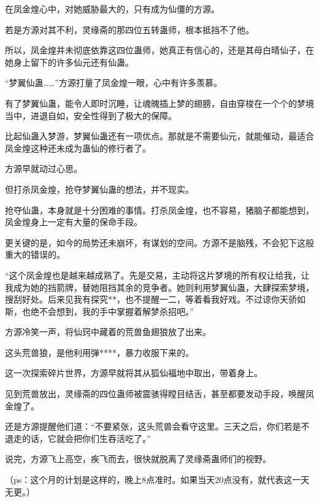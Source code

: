 \begin{this_body}
在凤金煌心中，对她威胁最大的，只有成为仙僵的方源。

若是方源对其不利，灵缘斋的那四位五转蛊师，根本抵挡不了他。

所以，凤金煌并未彻底依靠这四位蛊师，她真正有信心的，还是其母白晴仙子，在她身上留下的许多仙元还有仙蛊。

“梦翼仙蛊……”方源打量了凤金煌一眼，心中有许多羡慕。

有了梦翼仙蛊，能令人即时沉睡，让魂魄插上梦的翅膀，自由穿梭在一个个的梦境当中，进退自如，安全性得到了极大的保障。

比起仙蛊入梦游，梦翼仙蛊还有一项优点。那就是不需要仙元，就能催动，最适合凤金煌这种还未成为蛊仙的修行者了。

方源早就动过心思。

但打杀凤金煌，抢夺梦翼仙蛊的想法，并不现实。

抢夺仙蛊，本身就是十分困难的事情。打杀凤金煌，也不容易，猪脑子都能想到，凤金煌身上一定有大量的保命手段。

更关键的是，如今的局势还未崩坏，有谋划的空间。方源不是脑残，不会犯下这般重大的错误的。

“这个凤金煌也是越来越成熟了。先是交易，主动将这片梦境的所有权让给我，让我成为她的挡箭牌，替她阻挡其余的竞争者。她则利用梦翼仙蛊，大肆探索梦境，搜刮好处。后来见我有探究**，也不提醒一二，等着看我好戏。不过谅你天骄如斯，也绝不会想到，我的手中掌握着解梦杀招吧。”

方源冷笑一声，将仙窍中藏着的荒兽鱼翅狼放了出来。

这头荒兽狼，是他利用弹****，暴力收服下来的。

这一次探索碎片世界，方源早就将其从狐仙福地中取出，带着身上。

见到荒兽放出，灵缘斋的四位蛊师被震骇得瞠目结舌，甚至都要发动手段，唤醒凤金煌了。

还是方源提醒他们道：“不要紧张，这头荒兽会看守这里。三天之后，你们若是不退走的话，它就会把你们生吞活吃了。”

说完，方源飞上高空，疾飞而去，很快就脱离了灵缘斋蛊师们的视野。

（ps：这个月的计划是这样的，晚上8点准时。如果当天20点没有，就代表这一天无更。）

\end{this_body}

